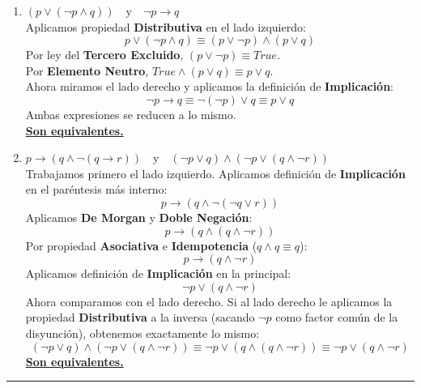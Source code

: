 \begin{enumerate}[label=\textbf{\alph*)}]
    \vspace{0.3cm}
    \item \textbf{$(p \vee (\neg p \wedge q)) \quad \text{y} \quad \neg p \rightarrow q$} \\
    Aplicamos propiedad \textbf{Distributiva} en el lado izquierdo:
    \[ p \vee (\neg p \wedge q) \equiv (p \vee \neg p) \wedge (p \vee q) \]
    Por ley del \textbf{Tercero Excluido}, $(p \vee \neg p) \equiv True$. \\
    Por \textbf{Elemento Neutro}, $True \wedge (p \vee q) \equiv p \vee q$. \\
    Ahora miramos el lado derecho y aplicamos la definición de \textbf{Implicación}:
    \[ \neg p \rightarrow q \equiv \neg(\neg p) \vee q \equiv p \vee q \]
    Ambas expresiones se reducen a lo mismo. \\
    \underline{\textbf{Son equivalentes.}}

    \vspace{0.3cm}
    \item \textbf{$p \rightarrow (q \wedge \neg(q \rightarrow r)) \quad \text{y} \quad (\neg p \vee q) \wedge (\neg p \vee (q \wedge \neg r))$} \\
    Trabajamos primero el lado izquierdo. Aplicamos definición de \textbf{Implicación} en el paréntesis más interno:
    \[ p \rightarrow (q \wedge \neg(\neg q \vee r)) \]
    Aplicamos \textbf{De Morgan} y \textbf{Doble Negación}:
    \[ p \rightarrow (q \wedge (q \wedge \neg r)) \]
    Por propiedad \textbf{Asociativa} e \textbf{Idempotencia} ($q \wedge q \equiv q$):
    \[ p \rightarrow (q \wedge \neg r) \]
    Aplicamos definición de \textbf{Implicación} en la principal:
    \[ \neg p \vee (q \wedge \neg r) \]
    Ahora comparamos con el lado derecho. Si al lado derecho le aplicamos la propiedad \textbf{Distributiva} a la inversa (sacando $\neg p$ como factor común de la disyunción), obtenemos exactamente lo mismo:
    \[ (\neg p \vee q) \wedge (\neg p \vee (q \wedge \neg r)) \equiv \neg p \vee (q \wedge (q \wedge \neg r)) \equiv \neg p \vee (q \wedge \neg r) \]
    \underline{\textbf{Son equivalentes.}}

\end{enumerate}

\vspace{0.5cm}
\hrule
\vspace{0.5cm}